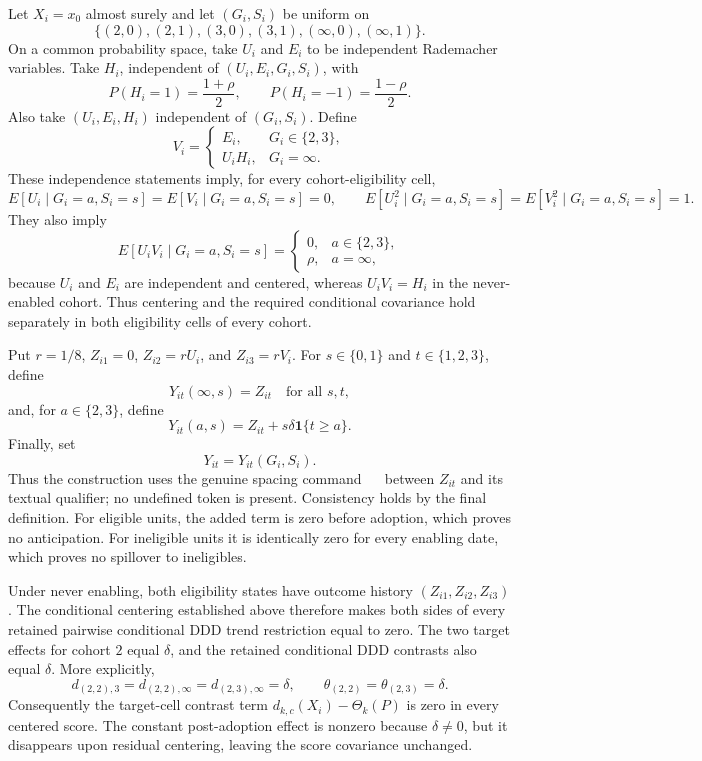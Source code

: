 Let \(X_i=x_0\) almost surely and let \((G_i,S_i)\) be uniform on
\[
\{(2,0),(2,1),(3,0),(3,1),(\infty,0),(\infty,1)\}.
\]
On a common probability space, take \(U_i\) and \(E_i\) to be independent Rademacher variables. Take \(H_i\), independent of \((U_i,E_i,G_i,S_i)\), with
\[
P(H_i=1)=\frac{1+\rho}{2},
\qquad
P(H_i=-1)=\frac{1-\rho}{2}.
\]
Also take \((U_i,E_i,H_i)\) independent of \((G_i,S_i)\). Define
\[
V_i=
\begin{cases}
E_i,&G_i\in\{2,3\},\\
U_iH_i,&G_i=\infty.
\end{cases}
\]
These independence statements imply, for every cohort-eligibility cell,
\[
E[U_i\mid G_i=a,S_i=s]=E[V_i\mid G_i=a,S_i=s]=0,
\qquad
E[U_i^2\mid G_i=a,S_i=s]=E[V_i^2\mid G_i=a,S_i=s]=1.
\]
They also imply
\[
E[U_iV_i\mid G_i=a,S_i=s]
=\begin{cases}
0,&a\in\{2,3\},\\
\rho,&a=\infty,
\end{cases}
\]
because \(U_i\) and \(E_i\) are independent and centered, whereas \(U_iV_i=H_i\) in the never-enabled cohort. Thus centering and the required conditional covariance hold separately in both eligibility cells of every cohort.

Put \(r=1/8\), \(Z_{i1}=0\), \(Z_{i2}=rU_i\), and \(Z_{i3}=rV_i\). For \(s\in\{0,1\}\) and \(t\in\{1,2,3\}\), define
\[
Y_{it}(\infty,s)=Z_{it}\quad\text{for all }s,t,
\]
and, for \(a\in\{2,3\}\), define
\[
Y_{it}(a,s)=Z_{it}+s\delta\mathbf 1\{t\ge a\}.
\]
Finally, set
\[
Y_{it}=Y_{it}(G_i,S_i).
\]
Thus the construction uses the genuine spacing command \(\quad\) between \(Z_{it}\) and its textual qualifier; no undefined token is present. Consistency holds by the final definition. For eligible units, the added term is zero before adoption, which proves no anticipation. For ineligible units it is identically zero for every enabling date, which proves no spillover to ineligibles.

Under never enabling, both eligibility states have outcome history \((Z_{i1},Z_{i2},Z_{i3})\). The conditional centering established above therefore makes both sides of every retained pairwise conditional DDD trend restriction equal to zero. The two target effects for cohort \(2\) equal \(\delta\), and the retained conditional DDD contrasts also equal \(\delta\). More explicitly,
\[
d_{(2,2),3}=d_{(2,2),\infty}
=d_{(2,3),\infty}=\delta,
\qquad
\theta_{(2,2)}=\theta_{(2,3)}=\delta.
\]
Consequently the target-cell contrast term \(d_{k,c}(X_i)-\Theta_k(P)\) is zero in every centered score. The constant post-adoption effect is nonzero because \(\delta\ne0\), but it disappears upon residual centering, leaving the score covariance unchanged.

